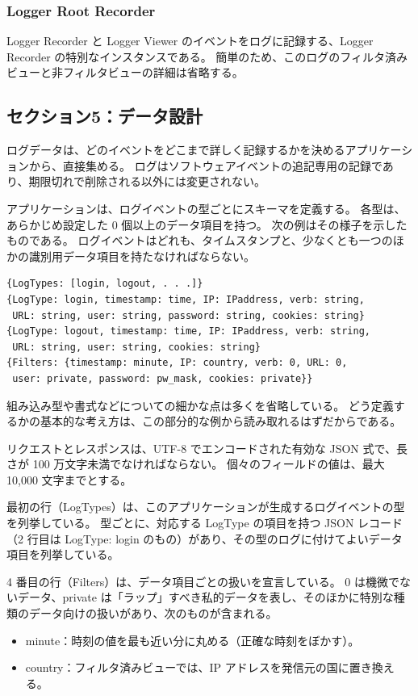 \documentclass[uplatex]{jsarticle}
\begin{document}
\subsubsection{Logger Root Recorder}

Logger Recorder と Logger Viewer のイベントをログに記録する、Logger Recorder の特別なインスタンスである。
簡単のため、このログのフィルタ済みビューと非フィルタビューの詳細は省略する。

\subsection{セクション5：データ設計}

ログデータは、どのイベントをどこまで詳しく記録するかを決めるアプリケーションから、直接集める。
ログはソフトウェアイベントの追記専用の記録であり、期限切れで削除される以外には変更されない。

アプリケーションは、ログイベントの型ごとにスキーマを定義する。
各型は、あらかじめ設定した 0 個以上のデータ項目を持つ。
次の例はその様子を示したものである。
ログイベントはどれも、タイムスタンプと、少なくとも一つのほかの識別用データ項目を持たなければならない。

\begin{verbatim}
{LogTypes: [login, logout, . . .]}
{LogType: login, timestamp: time, IP: IPaddress, verb: string,
 URL: string, user: string, password: string, cookies: string}
{LogType: logout, timestamp: time, IP: IPaddress, verb: string,
 URL: string, user: string, cookies: string}
{Filters: {timestamp: minute, IP: country, verb: 0, URL: 0,
 user: private, password: pw_mask, cookies: private}}
\end{verbatim}

組み込み型や書式などについての細かな点は多くを省略している。
どう定義するかの基本的な考え方は、この部分的な例から読み取れるはずだからである。

リクエストとレスポンスは、UTF-8 でエンコードされた有効な JSON 式で、長さが 100 万文字未満でなければならない。
個々のフィールドの値は、最大 10,000 文字までとする。

最初の行（LogTypes）は、このアプリケーションが生成するログイベントの型を列挙している。
型ごとに、対応する LogType の項目を持つ JSON レコード（2 行目は LogType: login のもの）があり、その型のログに付けてよいデータ項目を列挙している。

4 番目の行（Filters）は、データ項目ごとの扱いを宣言している。
0 は機微でないデータ、private は「ラップ」すべき私的データを表し、そのほかに特別な種類のデータ向けの扱いがあり、次のものが含まれる。
\begin{itemize}
\item minute：時刻の値を最も近い分に丸める（正確な時刻をぼかす）。
\item country：フィルタ済みビューでは、IP アドレスを発信元の国に置き換える。
\end{itemize}
\end{document}
